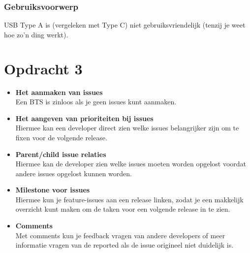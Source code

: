 \documentclass[11pt,english]{article}
\begin{document}
  \subsubsection{Gebruiksvoorwerp}
  \begin{center}
  \end{center}
  USB Type A is (vergeleken met Type C) niet gebruiksvriendelijk (tenzij je weet
  hoe zo'n ding werkt).

  \newpage
  \section{Opdracht 3}
  \begin{itemize}
    \item \textbf{Het aanmaken van issues} \\
      Een BTS is zinloos als je geen issues kunt aanmaken.
    \item \textbf{Het aangeven van prioriteiten bij issues} \\
      Hiermee kan een developer direct zien welke issues belangrijker zijn om te
      fixen voor de volgende release.
    \item \textbf{Parent/child issue relaties} \\
      Hiermee kan de developer zien welke issues moeten worden opgelost voordat
      andere issues opgelost kunnen worden.
    \item \textbf{Milestone voor issues} \\
      Hiermee kun je feature-issues aan een release linken, zodat je een
      makkelijk overzicht kunt maken om de taken voor een volgende release in te zien.
    \item \textbf{Comments} \\
      Met comments kun je feedback vragen van andere developers of meer
      informatie vragen van de reported als de issue origineel niet duidelijk is.
  \end{itemize}
\end{document}
